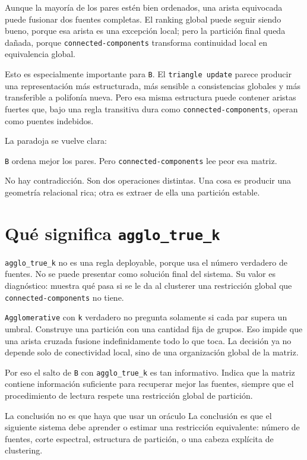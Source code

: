 \documentclass[11pt]{article}
\begin{document}
Aunque la mayoría de los pares estén bien ordenados, una arista equivocada puede fusionar dos fuentes completas. El ranking global puede seguir siendo bueno, porque esa arista es una excepción local; pero la partición final queda dañada, porque \texttt{connected-components} transforma continuidad local en equivalencia global.

Esto es especialmente importante para \texttt{B}. El \texttt{triangle update} parece producir una representación más estructurada, más sensible a consistencias globales y más transferible a polifonía nueva. Pero esa misma estructura puede contener aristas fuertes que, bajo una regla transitiva dura como \texttt{connected-components}, operan como puentes indebidos.

La paradoja se vuelve clara:

\begin{goldbox}
\texttt{B} ordena mejor los pares. Pero \texttt{connected-components} lee peor esa matriz.
\end{goldbox}

No hay contradicción. Son dos operaciones distintas. Una cosa es producir una geometría relacional rica; otra es extraer de ella una partición estable.

\section{Qué significa \texttt{agglo\_true\_k}}

\texttt{agglo\_true\_k} no es una regla deployable, porque usa el número verdadero de fuentes. No se puede presentar como solución final del sistema. Su valor es diagnóstico: muestra qué pasa si se le da al clusterer una restricción global que \texttt{connected-components} no tiene.

\texttt{Agglomerative} con \texttt{k} verdadero no pregunta solamente si cada par supera un umbral. Construye una partición con una cantidad fija de grupos. Eso impide que una arista cruzada fusione indefinidamente todo lo que toca. La decisión ya no depende solo de conectividad local, sino de una organización global de la matriz.

Por eso el salto de \texttt{B} con \texttt{agglo\_true\_k} es tan informativo. Indica que la matriz contiene información suficiente para recuperar mejor las fuentes, siempre que el procedimiento de lectura respete una restricción global de partición.

\begin{keybox}{La conclusión no es que haya que usar un oráculo}
La conclusión es que el siguiente sistema debe aprender o estimar una restricción equivalente: número de fuentes, corte espectral, estructura de partición, o una cabeza explícita de clustering.
\end{keybox}
\end{document}
